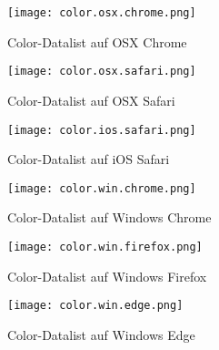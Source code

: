\begin{figure}[!htb]
    \centering
    \begin{minipage}[b]{0.28\textwidth}
        \centering
        \texttt{[image: color.osx.chrome.png]}
        \caption{Color-Datalist auf OSX Chrome}
        \label{img:colorOsxChromeDatalist}
    \end{minipage}
    \hfill
    \begin{minipage}[b]{0.28\textwidth}
        \centering
        \texttt{[image: color.osx.safari.png]}
        \caption{Color-Datalist auf OSX Safari}
        \label{img:colorOsxSafariDatalist}
    \end{minipage}
    \hfill
    \begin{minipage}[b]{0.28\textwidth}
        \centering
        \texttt{[image: color.ios.safari.png]}
        \caption{Color-Datalist auf iOS Safari}
        \label{img:colorOsxSafariDatalist}
    \end{minipage}
\end{figure}

\begin{figure}[!htb]
    \centering
    \begin{minipage}[b]{0.28\textwidth}
        \centering
        \texttt{[image: color.win.chrome.png]}
        \caption{Color-Datalist auf Windows Chrome}
        \label{img:colorWinChromeDatalist}
    \end{minipage}
    \hfill
    \begin{minipage}[b]{0.28\textwidth}
        \centering
        \texttt{[image: color.win.firefox.png]}
        \caption{Color-Datalist auf Windows Firefox}
        \label{img:colorWinFirefoxDatalist}
    \end{minipage}
    \hfill
    \begin{minipage}[b]{0.28\textwidth}
        \centering
        \texttt{[image: color.win.edge.png]}
        \caption{Color-Datalist auf Windows Edge}
        \label{img:colorWinEdgeDatalist}
    \end{minipage}
\end{figure}


